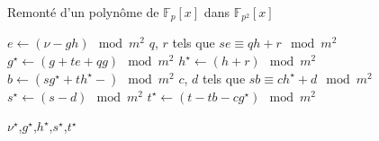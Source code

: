 \begin{algorithm}
  \caption{Remonté d'un polynôme de $\mathbb{F}_p[x]$ dans $\mathbb{F}_{p^2}[x]$}
  \label{alg:step}  
  \begin{algorithmic}[1]
    \Statex

    \State   $e \gets (\nu - gh) \mod m^2$
    \State $q$, $r$ tels que $se \equiv qh + r \mod m^2$
    \State $g^{\star} \gets (g+te+qg) \mod m^2$
    \State $h^{\star} \gets (h+r) \mod m^2$
    \State $b \gets (sg^{\star} + th^{\star} -) \mod m^2$
    \State $c$, $d$ tels que $sb \equiv ch^{\star} + d \mod m^2$
    \State $s^{\star} \gets (s-d) \mod m^2$
    \State $t^{\star} \gets (t-tb-cg^{\star}) \mod m^2$

      \State \Return $\nu^{\star}$,$g^{\star}$,$h^{\star}$,$s^{\star}$,$t^{\star}$
    \EndFunction
  \end{algorithmic}
\end{algorithm}
